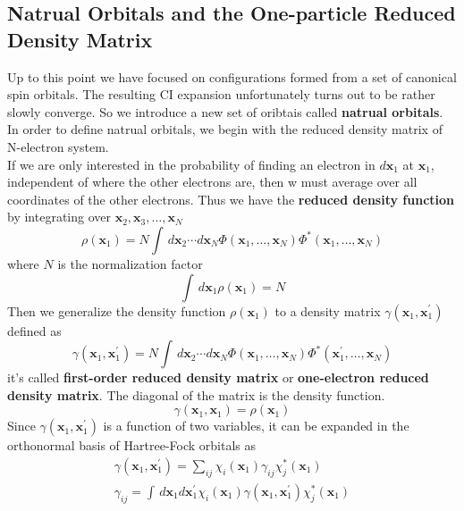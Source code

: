 \documentclass[11pt]{article}
\begin{document}
\subsection{Natrual Orbitals and the One-particle Reduced Density Matrix}
Up to this point we have focused on configurations formed from a set of canonical spin orbitals. The resulting CI expansion unfortunately
turns out to be rather slowly converge. So we introduce a new set of oribtais called \textbf{natrual orbitals}. In order to define natrual
orbitals, we begin with the reduced density matrix of N-electron system.\\
If we are only interested in the probability of finding an electron in $d\mathbf{x}_1$ at $\mathbf{x}_1$, independent of where the other
electrons are, then w must average over all coordinates of the other electrons. Thus we have the \textbf{reduced density function} by integrating
over $\mathbf{x}_2,\mathbf{x}_3,\ldots,\mathbf{x}_N$
\begin{equation}
    \rho(\mathbf{x}_1)=N\int\,d\mathbf{x}_2\cdots d\mathbf{x}_N\Phi(\mathbf{x}_1,\ldots,\mathbf{x}_N)\Phi^*(\mathbf{x}_1,\ldots,\mathbf{x}_N)
\end{equation}
where $N$ is the normalization factor
\begin{equation}
    \int\,d\mathbf{x}_1\rho(\mathbf{x}_1)=N
\end{equation}
Then we generalize the density function $\rho(\mathbf{x}_1)$ to a density matrix $\gamma(\mathbf{x}_1,\mathbf{x}_1^{'})$ defined as
\begin{equation}
    \gamma(\mathbf{x}_1,\mathbf{x}_1^{'})=N\int\,d\mathbf{x}_2\cdots d\mathbf{x}_N\Phi(\mathbf{x}_1,\ldots,\mathbf{x}_N)\Phi^*(\mathbf{x}_1^{'},\ldots,\mathbf{x}_N)
\end{equation}
it's called \textbf{first-order reduced density matrix} or \textbf{one-electron reduced density matrix}. The diagonal of the matrix is the density function.\\
\begin{equation}
    \gamma(\mathbf{x}_1,\mathbf{x}_1)=\rho(\mathbf{x}_1)
\end{equation}
Since $\gamma(\mathbf{x}_1,\mathbf{x}_1^{'})$ is a function of two variables, it can be expanded in the orthonormal basis of Hartree-Fock
orbitals as
\begin{gather}
    \gamma(\mathbf{x}_1,\mathbf{x}_1^{'})=\sum_{ij}\chi_i(\mathbf{x}_1)\gamma_{ij}\chi_j^*(\mathbf{x}_1)\\
    \gamma_{ij}=\int\,d\mathbf{x}_1d\mathbf{x}_1^{'}\chi_i(\mathbf{x}_1)\gamma(\mathbf{x}_1,\mathbf{x}_1^{'})\chi_j^*(\mathbf{x}_1)
\end{gather}
\end{document}
